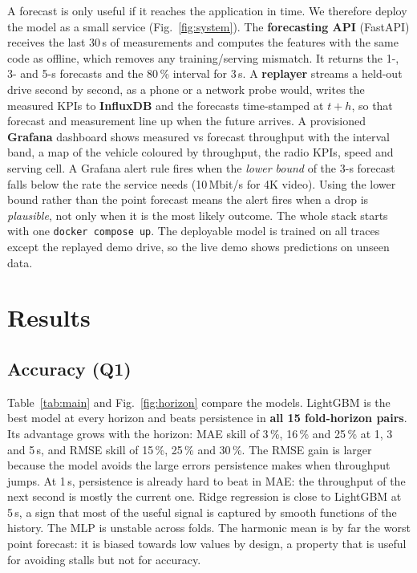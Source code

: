 \documentclass[10pt,a4paper,twocolumn]{article}
\begin{document}
A forecast is only useful if it reaches the application in time. We therefore deploy the
model as a small service (Fig.~\ref{fig:system}). The \textbf{forecasting API} (FastAPI)
receives the last 30\,s of measurements and computes the features with the same code as
offline, which removes any training/serving mismatch. It returns the 1-, 3- and 5-s
forecasts and the 80\,\% interval for 3\,s. A \textbf{replayer} streams a held-out drive
second by second, as a phone or a network probe would, writes the measured KPIs to
\textbf{InfluxDB} and the forecasts time-stamped at $t+h$, so that forecast and
measurement line up when the future arrives. A provisioned \textbf{Grafana} dashboard
shows measured vs forecast throughput with the interval band, a map of the vehicle coloured
by throughput, the radio KPIs, speed and serving cell. A Grafana alert rule fires when the
\emph{lower bound} of the 3-s forecast falls below the rate the service needs (10\,Mbit/s
for 4K video). Using the lower bound rather than the point forecast means the alert fires
when a drop is \emph{plausible}, not only when it is the most likely outcome. The whole
stack starts with one \texttt{docker compose up}. The deployable model is trained on all
traces except the replayed demo drive, so the live demo shows predictions on unseen data.

\section{Results}
\label{sec:results}

\subsection{Accuracy (Q1)}
Table~\ref{tab:main} and Fig.~\ref{fig:horizon} compare the models. LightGBM is the best
model at every horizon and beats persistence in \textbf{all 15 fold-horizon pairs}. Its
advantage grows with the horizon: MAE skill of 3\,\%, 16\,\% and 25\,\% at 1, 3 and 5\,s,
and RMSE skill of 15\,\%, 25\,\% and 30\,\%. The RMSE gain is larger because the model
avoids the large errors persistence makes when throughput jumps. At 1\,s, persistence is
already hard to beat in MAE: the throughput of the next second is mostly the current one.
Ridge regression is close to LightGBM at 5\,s, a sign that most of the useful signal is
captured by smooth functions of the history. The MLP is unstable across folds. The harmonic
mean is by far the worst point forecast: it is biased towards low values by design, a
property that is useful for avoiding stalls but not for accuracy.
\end{document}

